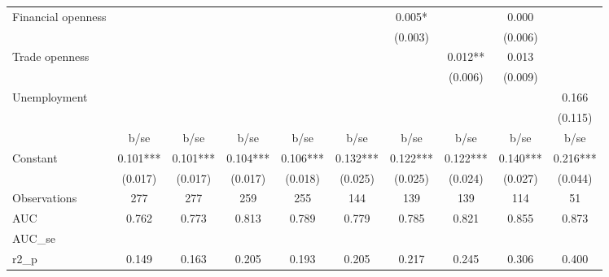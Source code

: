 \begin{tabular}{l*{9}{c}}
Financial openness              &               &               &               &               &               &       0.005*  &               &       0.000   &               \\
                                &               &               &               &               &               &     (0.003)   &               &     (0.006)   &               \\
Trade openness                  &               &               &               &               &               &               &       0.012** &       0.013   &               \\
                                &               &               &               &               &               &               &     (0.006)   &     (0.009)   &               \\
Unemployment                    &               &               &               &               &               &               &               &               &       0.166   \\
                                &               &               &               &               &               &               &               &               &     (0.115)   \\


                                &        b/se   &        b/se   &        b/se   &        b/se   &        b/se   &        b/se   &        b/se   &        b/se   &        b/se   \\
\hline
Constant                        &       0.101***&       0.101***&       0.104***&       0.106***&       0.132***&       0.122***&       0.122***&       0.140***&       0.216***\\
                                &     (0.017)   &     (0.017)   &     (0.017)   &     (0.018)   &     (0.025)   &     (0.025)   &     (0.024)   &     (0.027)   &     (0.044)   \\


\hline
\hline
Observations                    &      277         &      277         &      259         &      255         &      144         &      139         &      139         &      114         &       51         \\
AUC                             &    0.762         &    0.773         &    0.813         &    0.789         &    0.779         &    0.785         &    0.821         &    0.855         &    0.873         \\
AUC\_se                          &                  &                  &                  &                  &                  &                  &                  &                  &                  \\
r2\_p                            &    0.149         &    0.163         &    0.205         &    0.193         &    0.205         &    0.217         &    0.245         &    0.306         &    0.400         \\
\end{tabular}
